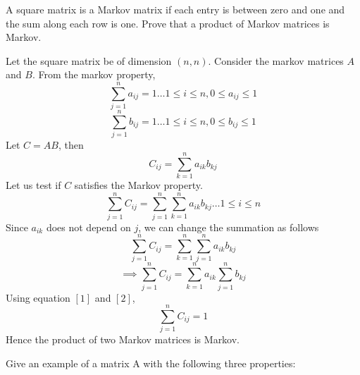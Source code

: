 \documentclass[solution,addpoints,12pt]{exam}
\newenvironment{Solution}{\begin{solution}}{\end{solution}}
\begin{document}
\begin{questions}
\question A square matrix is a Markov matrix if each entry is between zero and one and the sum along each row is one. Prove that a product of Markov matrices is Markov.
\begin{Solution}
Let the square matrix be of dimension $(n,n)$. Consider the markov matrices $A$ and $B$. From the markov property,
\begin{equation}
\sum_{j=1}^{n}a_{ij} = 1 \dots 1\leq i \leq n, 0\leq a_{ij} \leq 1
\end{equation}
\begin{equation}
\sum_{j=1}^{n}b_{ij} = 1 \dots 1\leq i \leq n, 0\leq b_{ij} \leq 1
\end{equation}
Let $C = AB$, then
\[C_{ij} = \sum_{k=1}^{n}a_{ik}b_{kj}\]
Let us test if $C$ satisfies the Markov property.
\[\sum_{j=1}^{n}C_{ij} = \sum_{j=1}^{n}\sum_{k=1}^{n}a_{ik}b_{kj} \dots 1 \leq i \leq n\]
Since $a_{ik}$ does not depend on $j$, we can change the summation as follows
\[\sum_{j=1}^{n}C_{ij} = \sum_{k=1}^{n}\sum_{j=1}^{n}a_{ik}b_{kj}\]
\[\implies \sum_{j=1}^{n}C_{ij} = \sum_{k=1}^{n}a_{ik}\sum_{j=1}^{n}b_{kj}\]
Using equation $[1]$ and $[2]$, 
\[\sum_{j=1}^{n}C_{ij} = 1\]
Hence the product of two Markov matrices is Markov.
\end{Solution}


\question  Give an example of a matrix A with the following three properties:
\end{questions}
\end{document}
